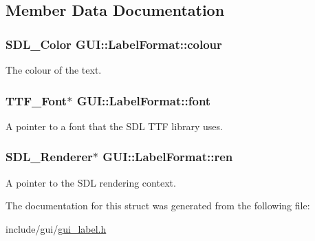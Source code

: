 \subsection{Member Data Documentation}
\hypertarget{structGUI_1_1LabelFormat_a9fc3a6fd4190d525537805c5fb46d8c8}{
\subsubsection[{colour}]{\setlength{\rightskip}{0pt plus 5cm}S\-D\-L\-\_\-\-Color G\-U\-I\-::\-Label\-Format\-::colour}}\label{structGUI_1_1LabelFormat_a9fc3a6fd4190d525537805c5fb46d8c8}


The colour of the text. 

\hypertarget{structGUI_1_1LabelFormat_ad2fb1c8fd378426a975b37c553ae1236}{
\subsubsection[{font}]{\setlength{\rightskip}{0pt plus 5cm}T\-T\-F\-\_\-\-Font$\ast$ G\-U\-I\-::\-Label\-Format\-::font}}\label{structGUI_1_1LabelFormat_ad2fb1c8fd378426a975b37c553ae1236}


A pointer to a font that the S\-D\-L T\-T\-F library uses. 

\hypertarget{structGUI_1_1LabelFormat_a5523dc0539e9a1150a7f7cc06139305e}{
\subsubsection[{ren}]{\setlength{\rightskip}{0pt plus 5cm}S\-D\-L\-\_\-\-Renderer$\ast$ G\-U\-I\-::\-Label\-Format\-::ren}}\label{structGUI_1_1LabelFormat_a5523dc0539e9a1150a7f7cc06139305e}


A pointer to the S\-D\-L rendering context. 



The documentation for this struct was generated from the following file\-:\begin{DoxyCompactItemize}
\item 
include/gui/\hyperlink{gui__label_8h}{gui\-\_\-label.\-h}\end{DoxyCompactItemize}
